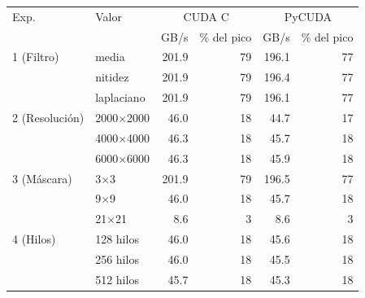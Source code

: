 \begin{tabular}{llrrrr}
\toprule
Exp. & Valor & \multicolumn{2}{c}{CUDA C} & \multicolumn{2}{c}{PyCUDA} \\
 & & GB/s & \% del pico & GB/s & \% del pico \\
\midrule
1 (Filtro) & media & 201.9 & 79 & 196.1 & 77 \\
 & nitidez & 201.9 & 79 & 196.4 & 77 \\
 & laplaciano & 201.9 & 79 & 196.1 & 77 \\
\midrule
2 (Resolución) & 2000$\times$2000 & 46.0 & 18 & 44.7 & 17 \\
 & 4000$\times$4000 & 46.3 & 18 & 45.7 & 18 \\
 & 6000$\times$6000 & 46.3 & 18 & 45.9 & 18 \\
\midrule
3 (Máscara) & 3$\times$3 & 201.9 & 79 & 196.5 & 77 \\
 & 9$\times$9 & 46.0 & 18 & 45.7 & 18 \\
 & 21$\times$21 & 8.6 & 3 & 8.6 & 3 \\
\midrule
4 (Hilos) & 128 hilos & 46.0 & 18 & 45.6 & 18 \\
 & 256 hilos & 46.0 & 18 & 45.5 & 18 \\
 & 512 hilos & 45.7 & 18 & 45.3 & 18 \\
\bottomrule
\end{tabular}

